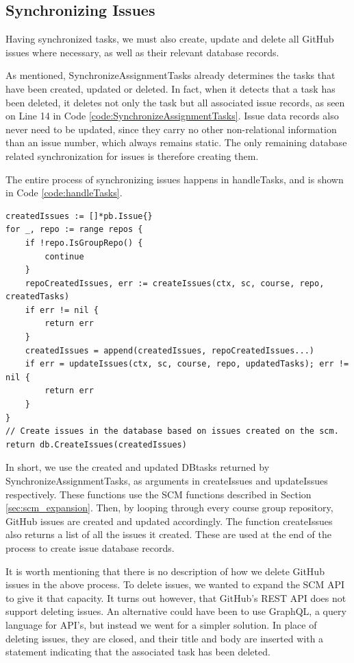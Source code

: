 \subsection{Synchronizing Issues}

Having synchronized tasks, we must also create, update and delete all GitHub issues where necessary, as well as their relevant database records.

As mentioned, SynchronizeAssignmentTasks already determines the tasks that have been created, updated or deleted.
In fact, when it detects that a task has been deleted, it deletes not only the task but all associated issue records, as seen on Line 14 in Code \ref{code:SynchronizeAssignmentTasks}.
Issue data records also never need to be updated, since they carry no other non-relational information than an issue number, which always remains static.
The only remaining database related synchronization for issues is therefore creating them.

The entire process of synchronizing issues happens in handleTasks, and is shown in Code \ref{code:handleTasks}.
\begin{lstlisting}[caption={Issue synchronization performed by handleTasks}, language=Golang, label={code:handleTasks},
                    commentstyle={\slshape}]
createdIssues := []*pb.Issue{}
for _, repo := range repos {
	if !repo.IsGroupRepo() {
		continue
	}
	repoCreatedIssues, err := createIssues(ctx, sc, course, repo, createdTasks)
	if err != nil {
		return err
	}
	createdIssues = append(createdIssues, repoCreatedIssues...)
	if err = updateIssues(ctx, sc, course, repo, updatedTasks); err != nil {
		return err
	}
}
// Create issues in the database based on issues created on the scm.
return db.CreateIssues(createdIssues)
\end{lstlisting}

In short, we use the created and updated DBtasks returned by SynchronizeAssignmentTasks, as arguments in createIssues and updateIssues respectively.
These functions use the SCM functions described in Section \ref{sec:scm_expansion}.
Then, by looping through every course group repository, GitHub issues are created and updated accordingly.
The function createIssues also returns a list of all the issues it created.
These are used at the end of the process to create issue database records.

It is worth mentioning that there is no description of how we delete GitHub issues in the above process.
To delete issues, we wanted to expand the SCM API to give it that capacity.
It turns out however, that GitHub's REST API does not support deleting issues.
An alternative could have been to use GraphQL, a query language for API's, but instead we went for a simpler solution.
In place of deleting issues, they are closed, and their title and body are inserted with a statement indicating that the associated task has been deleted.


